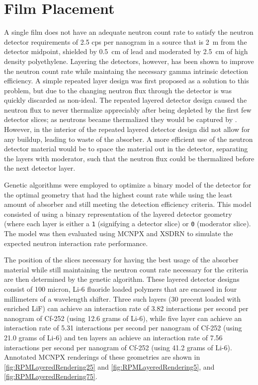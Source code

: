 \section{Film Placement}
A single film does not have an adequate neutron count rate to satisfy the neutron detector requirements of 2.5 cps per nanogram  in a source that is \SI{2}{\m} from the detector midpoint, shielded by \SI{0.5}{\cm} of lead and moderated by \SI{2.5}{\cm} of high density polyethylene.
Layering the detectors, however, has been shown to improve the neutron count rate while maintaing the necessary gamma intrinsic detection efficiency.
A simple repeated layer design was first proposed as a solution to this problem, but due to the changing neutron flux through the detector is was quickly discarded as non-ideal.
The repeated layered detector design caused the neutron flux to never thermalize appreciably after being depleted by the first few detector slices; as neutrons became thermalized they would be captured by .
However, in the interior of the repeated layered detector design did not allow for any buildup, leading to waste of the absorber.
A more efficient use of the neutron detector material would be to space the material out in the detector, separating the layers with moderator, such that the neutron flux could be thermalized before the next detector layer.

Genetic algorithms were employed to optimize a binary model of the detector for the optimal geometry that had the highest count rate while using the least amount of absorber and still meeting the detection efficiency criteria.
This model consisted of using a binary representation of the layered detector geometry (where each layer is either a \verb+1+ (signifying a detector slice) or \verb+0+ (moderator slice).
The model was then evaluated using MCNPX and XSDRN to simulate the expected neutron interaction rate performance.

The position of the slices necessary for having the best usage of the absorber material while still maintaining the neutron count rate necessary for the criteria are then determined by the genetic algorithm.
These layered detector designs consist of 100 micron, Li-6 fluoride loaded polymers that are encased in four millimeters of a wavelength shifter.
Three such layers (30 precent loaded with enriched LiF) can achieve an interaction rate of 3.82 interactions per second per nanogram of Cf-252 (using 12.6 grams of Li-6), while five layer can achieve an interaction rate of 5.31 interactions per second per nanogram of Cf-252 (using 21.0 grams of Li-6)  and ten layers an achieve an interaction rate of 7.56 interactions per second per nanogram of Cf-252 (using 41.2 grams of Li-6).
Annotated MCNPX renderings of these geometries are shown in \autoref{fig:RPMLayeredRendering25} and \autoref{fig:RPMLayeredRendering5}, and \autoref{fig:RPMLayeredRendering75}.

